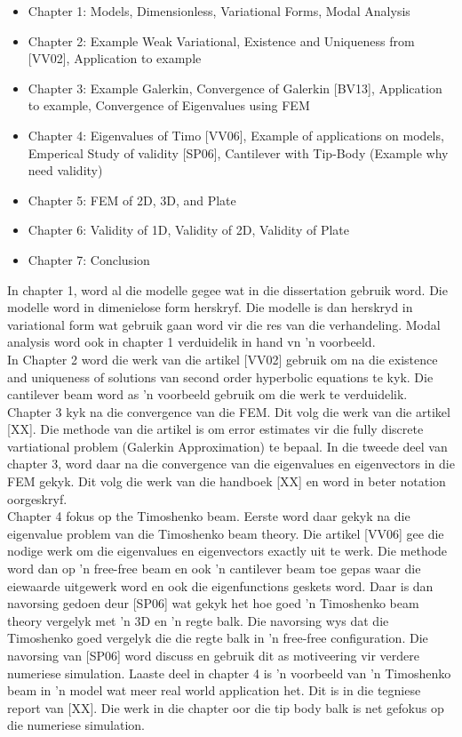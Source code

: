 \documentclass[../main.tex]{subfiles}
\begin{document}
\begin{itemize}
	\item Chapter 1: Models, Dimensionless, Variational Forms, Modal Analysis
	\item Chapter 2: Example Weak Variational, Existence and Uniqueness from [VV02], Application to example
	\item Chapter 3: Example Galerkin, Convergence of Galerkin [BV13], Application to example, Convergence of Eigenvalues using FEM
	\item Chapter 4: Eigenvalues of Timo [VV06], Example of applications on models, Emperical Study of validity [SP06], Cantilever with Tip-Body (Example why need validity)
	\item Chapter 5: FEM of 2D, 3D, and Plate
	\item Chapter 6: Validity of 1D, Validity of 2D, Validity of Plate
	\item Chapter 7: Conclusion
\end{itemize}


In chapter 1, word al die modelle gegee wat in die dissertation gebruik word. Die modelle word in dimenielose form herskryf. Die modelle is dan herskryd in variational form wat gebruik gaan word vir die res van die verhandeling. Modal analysis word ook in chapter 1 verduidelik in hand vn 'n voorbeeld.\\

 In Chapter 2 word die werk van die artikel [VV02] gebruik om na die existence and uniqueness of solutions van second order hyperbolic equations te kyk. Die cantilever beam word as 'n voorbeeld gebruik om die werk te verduidelik.\\
 
 Chapter 3 kyk na die convergence van die FEM. Dit volg die werk van die artikel [XX]. Die methode van die artikel is om error estimates vir die fully discrete vartiational problem (Galerkin Approximation) te bepaal. In die tweede deel van chapter 3, word daar na die convergence van die eigenvalues en eigenvectors in die FEM gekyk. Dit volg die werk van die handboek [XX] en word in beter notation oorgeskryf.\\
 
 Chapter 4 fokus op the Timoshenko beam. Eerste word daar gekyk na die eigenvalue problem van die Timoshenko beam theory. Die artikel [VV06] gee die nodige werk om die eigenvalues en eigenvectors exactly uit te werk. Die methode word dan op 'n free-free beam en ook 'n cantilever beam toe gepas waar die eiewaarde uitgewerk word en ook die eigenfunctions geskets word. Daar is dan navorsing gedoen deur [SP06] wat gekyk het hoe goed 'n Timoshenko beam theory vergelyk met 'n 3D en 'n regte balk. Die navorsing wys dat die Timoshenko goed vergelyk die die regte balk in 'n free-free configuration. Die navorsing van [SP06] word discuss en gebruik dit as motiveering vir verdere numeriese simulation. Laaste deel in chapter 4 is 'n voorbeeld van 'n Timoshenko beam in 'n model wat meer real world application het. Dit is in die tegniese report van [XX]. Die werk in die chapter oor die tip body balk is net gefokus op die numeriese simulation.\\
 
\end{document}
